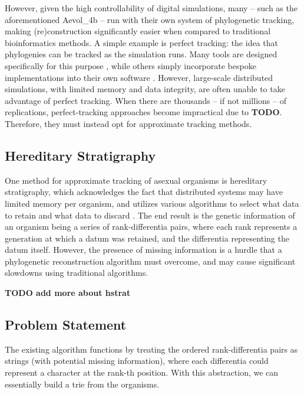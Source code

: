 However, given the high controllability of digital simulations, many -- such as the aforementioned Aevol\_4b -- run with their own system of phylogenetic tracking, making (re)construction significantly easier when compared to traditional bioinformatics methods.
A simple example is perfect tracking: the idea that phylogenies can be tracked as the simulation runs. Many tools are designed specifically for this purpose \citep{dolson2024phylotrack}, while others simply incorporate bespoke implementations into their own software \citep{ofria2004avida}. However, large-scale distributed simulations, with limited memory and data integrity, are often unable to take advantage of perfect tracking.
When there are thousands -- if not millions -- of replications, perfect-tracking approaches become impractical due to \textbf{TODO}.
Therefore, they must instead opt for approximate tracking methods.

\subsection{Hereditary Stratigraphy} \label{sec:introduction:hstrat}

One method for approximate tracking of asexual organisms is hereditary stratigraphy, which acknowledges the fact that distributed systems may have limited memory per organism, and utilizes various algorithms to select what data to retain and what data to discard \citep{moreno2022hstrat}.
The end result is the genetic information of an organism being a series of rank-differentia pairs, where each rank represents a generation at which a datum was retained, and the differentia representing the datum itself.
However, the presence of missing information is a hurdle that a phylogenetic reconstruction algorithm must overcome, and may cause significant slowdowns using traditional algorithms.



\textbf{TODO add more about hstrat}

\subsection{Problem Statement} \label{sec:introduction:problem}

The existing algorithm functions by treating the ordered rank-differentia pairs as strings (with potential missing information), where each differentia could represent a character at the rank-th position.
With this abstraction, we can essentially build a trie \citep{fredkin1960trie} from the organisms.

